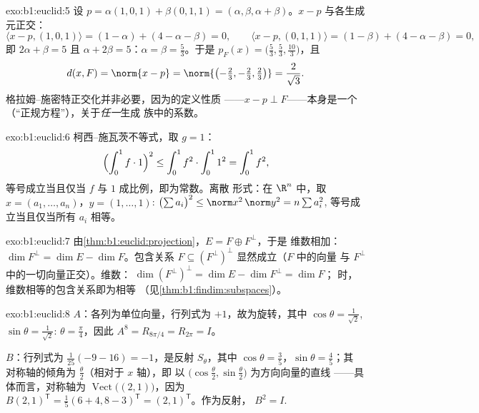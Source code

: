 \begin{solution}{exo:b1:euclid:5}
设 $p = \alpha(1,0,1) + \beta(0,1,1) = (\alpha, \beta, \alpha +
\beta)$。$x - p$ 与各生成元正交：
\[
\langle x - p, (1,0,1)\rangle = (1 - \alpha) + (4 - \alpha - \beta)
= 0,
\qquad
\langle x - p, (0,1,1)\rangle = (1 - \beta) + (4 - \alpha - \beta)
= 0,
\]
即 $2\alpha + \beta = 5$ 且 $\alpha + 2\beta = 5$：$\alpha =
\beta = \frac53$。于是 $p_F(x) = \bigl(\frac53, \frac53,
\frac{10}{3}\bigr)$，且
\[
d(x, F) = \norm{x - p} =
\norm{\bigl(-\tfrac23, -\tfrac23, \tfrac23\bigr)} =
\frac{2}{\sqrt 3} .
\]
格拉姆–施密特正交化并非必要，因为的定义性质
——$x - p \perp F$——本身是一个
（“正规方程”），关于\emph{任一}生成
族中的系数。
\end{solution}

\begin{solution}{exo:b1:euclid:6}
柯西–施瓦茨不等式，取 $g = 1$：
\[
\Bigl(\int_0^1 f \cdot 1\Bigr)^2 \leq \int_0^1 f^2 \cdot \int_0^1
1^2 = \int_0^1 f^2 ,
\]
等号成立当且仅当 $f$ 与 $1$ 成比例，即为常数。离散
形式：在 $\R^n$ 中，取 $x = (a_1, \dots, a_n)$，$y = (1, \dots,
1)$:
$\bigl(\sum a_i\bigr)^2 \leq \norm x^2\, \norm y^2 = n \sum a_i^2$,
等号成立当且仅当所有 $a_i$ 相等。
\end{solution}

\begin{solution}{exo:b1:euclid:7}
由\cref{thm:b1:euclid:projection}，$E = F \oplus F^\perp$，于是
维数相加：$\dim F^\perp = \dim E - \dim F$。包含关系 $F
\subseteq (F^\perp)^\perp$ 显然成立（$F$ 中的向量
与 $F^\perp$ 中的一切向量正交）。维数：
$\dim(F^\perp)^\perp = \dim E - \dim F^\perp = \dim F$；
时，维数相等的包含关系即为相等
（见\cref{thm:b1:findim:subspaces}）。
\end{solution}

\begin{solution}{exo:b1:euclid:8}
$A$：各列为单位向量，行列式为 $+1$，故为旋转，其中 $\cos\theta =
\frac{1}{\sqrt2}$, $\sin\theta = \frac{1}{\sqrt2}$: $\theta =
\frac\pi4$，因此 $A^8 = R_{8\pi/4} = R_{2\pi} = I$。

$B$：行列式为 $\frac{1}{25}(-9 - 16) = -1$，是反射
$S_\theta$，其中 $\cos\theta = \frac35$，$\sin\theta = \frac45$；其
对称轴的倾角为 $\frac\theta2$（相对于 $x$ 轴），即
以 $\bigl(\cos\frac\theta2, \sin\frac\theta2\bigr)$ 为方向向量的直线
——具体而言，对称轴为
$\operatorname{Vect}\bigl((2, 1)\bigr)$，因为 $B(2,1)^{\mathsf T} =
\frac15(6+4, 8-3)^{\mathsf T} = (2,1)^{\mathsf T}$。作为反射，
$B^2 = I$.
\end{solution}

